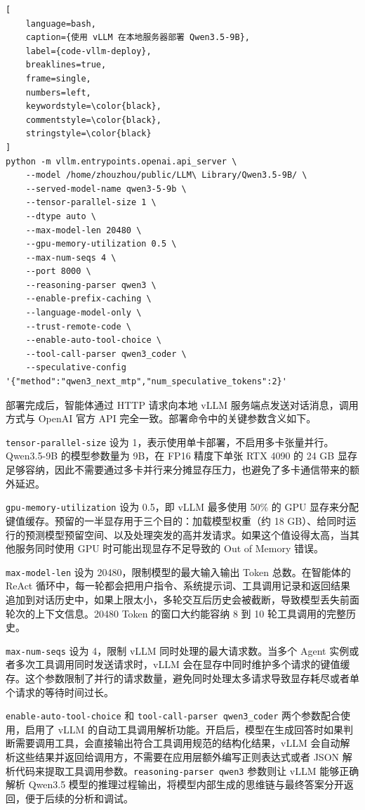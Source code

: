 \begin{lstlisting}[
    language=bash,
    caption={使用 vLLM 在本地服务器部署 Qwen3.5-9B},
    label={code-vllm-deploy},
    breaklines=true,
    frame=single,
    numbers=left,
    keywordstyle=\color{black},
    commentstyle=\color{black},
    stringstyle=\color{black}
]
python -m vllm.entrypoints.openai.api_server \
    --model /home/zhouzhou/public/LLM\ Library/Qwen3.5-9B/ \
    --served-model-name qwen3-5-9b \
    --tensor-parallel-size 1 \
    --dtype auto \
    --max-model-len 20480 \
    --gpu-memory-utilization 0.5 \
    --max-num-seqs 4 \
    --port 8000 \
    --reasoning-parser qwen3 \
    --enable-prefix-caching \
    --language-model-only \
    --trust-remote-code \
    --enable-auto-tool-choice \
    --tool-call-parser qwen3_coder \
    --speculative-config '{"method":"qwen3_next_mtp","num_speculative_tokens":2}'
\end{lstlisting}

部署完成后，智能体通过 HTTP 请求向本地 vLLM 服务端点发送对话消息，调用方式与 OpenAI 官方 API 完全一致。部署命令中的关键参数含义如下。

\texttt{tensor-parallel-size} 设为 1，表示使用单卡部署，不启用多卡张量并行。Qwen3.5-9B 的模型参数量为 9B，在 FP16 精度下单张 RTX 4090 的 24 GB 显存足够容纳，因此不需要通过多卡并行来分摊显存压力，也避免了多卡通信带来的额外延迟。

\texttt{gpu-memory-utilization} 设为 0.5，即 vLLM 最多使用 50\% 的 GPU 显存来分配键值缓存。预留的一半显存用于三个目的：加载模型权重（约 18 GB）、给同时运行的预测模型预留空间、以及处理突发的高并发请求。如果这个值设得太高，当其他服务同时使用 GPU 时可能出现显存不足导致的 Out of Memory 错误。

\texttt{max-model-len} 设为 20480，限制模型的最大输入输出 Token 总数。在智能体的 ReAct 循环中，每一轮都会把用户指令、系统提示词、工具调用记录和返回结果追加到对话历史中，如果上限太小，多轮交互后历史会被截断，导致模型丢失前面轮次的上下文信息。20480 Token 的窗口大约能容纳 8 到 10 轮工具调用的完整历史。

\texttt{max-num-seqs} 设为 4，限制 vLLM 同时处理的最大请求数。当多个 Agent 实例或者多次工具调用同时发送请求时，vLLM 会在显存中同时维护多个请求的键值缓存。这个参数限制了并行的请求数量，避免同时处理太多请求导致显存耗尽或者单个请求的等待时间过长。

\texttt{enable-auto-tool-choice} 和 \texttt{tool-call-parser qwen3\_coder} 两个参数配合使用，启用了 vLLM 的自动工具调用解析功能。开启后，模型在生成回答时如果判断需要调用工具，会直接输出符合工具调用规范的结构化结果，vLLM 会自动解析这些结果并返回给调用方，不需要在应用层额外编写正则表达式或者 JSON 解析代码来提取工具调用参数。\texttt{reasoning-parser qwen3} 参数则让 vLLM 能够正确解析 Qwen3.5 模型的推理过程输出，将模型内部生成的思维链与最终答案分开返回，便于后续的分析和调试。

